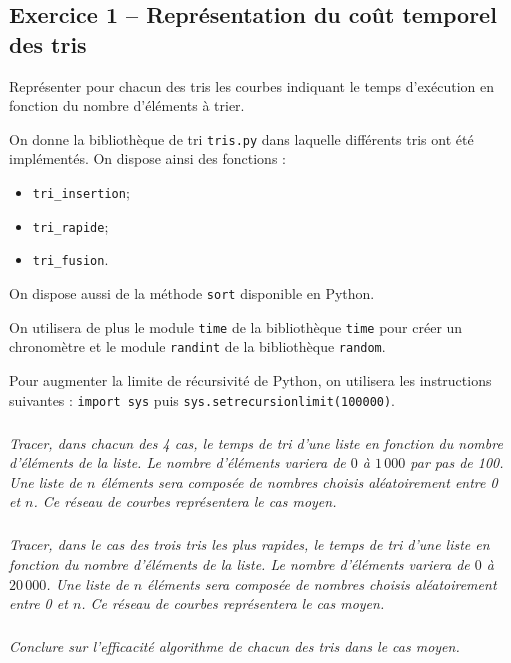 \documentclass[10pt,fleqn]{article} %
\begin{document}

\vspace{5cm}
\pagestyle{fancy}
\thispagestyle{plain}


\def\columnseprulecolor{\color{ocre}}
\setlength{\columnseprule}{0.4pt} 
\begin{multicols}{2}

\section*{Exercice 1 -- Représentation du coût temporel des tris}

\begin{obj}
Représenter pour chacun des tris les courbes indiquant le temps d'exécution en fonction du nombre d'éléments à trier.
\end{obj}
On donne la bibliothèque de tri \texttt{tris.py} dans laquelle différents tris ont été implémentés.
On dispose ainsi des fonctions : 
\begin{itemize}
\item \texttt{tri\_insertion};
\item \texttt{tri\_rapide};
\item \texttt{tri\_fusion}.
\end{itemize}
On dispose aussi de la méthode \texttt{sort} disponible en Python.

On utilisera de plus le module \texttt{time} de la bibliothèque \texttt{time} pour créer un chronomètre et le module \texttt{randint} de la bibliothèque \texttt{random}.

Pour augmenter la limite de récursivité de Python, on utilisera les instructions suivantes : \texttt{import sys} puis \texttt{sys.setrecursionlimit(100000)}.

\subparagraph{}
\textit{Tracer, dans chacun des 4 cas, le temps de tri d'une liste en fonction du nombre d'éléments de la liste. Le nombre d'éléments variera de $0$ à $1\, 000$ par pas de 100. Une liste de $n$ éléments sera composée de nombres choisis aléatoirement entre 0 et $n$. Ce réseau de courbes représentera le cas moyen.}

\subparagraph{}
\textit{Tracer, dans le cas des trois tris les plus rapides, le temps de tri d'une liste en fonction du nombre d'éléments de la liste. Le nombre d'éléments variera de $0$ à $20\, 000$. Une liste de $n$ éléments sera composée de nombres choisis aléatoirement entre 0 et $n$. Ce réseau de courbes représentera le cas moyen.}

\subparagraph{}
\textit{Conclure sur l'efficacité algorithme de chacun des tris dans le cas moyen.}


\end{multicols}
\end{document}
